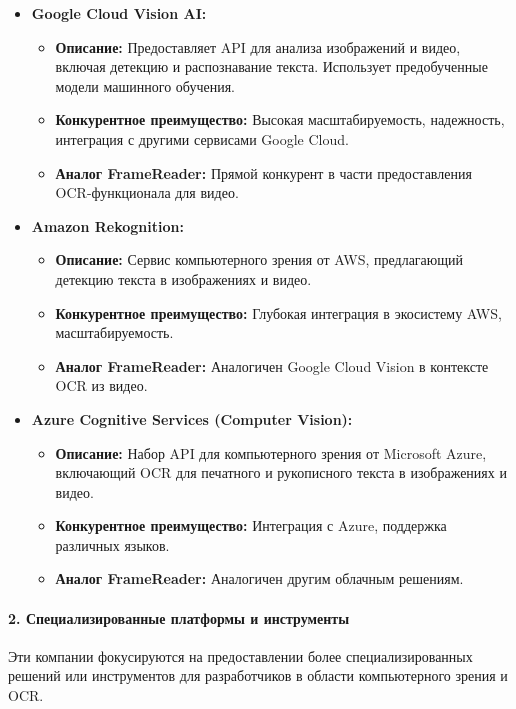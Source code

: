 \documentclass[12pt, a4paper]{article}
\theoremstyle{definition}
\theoremstyle{remark}
\begin{document}
	\begin{itemize}
		\item \textbf{Google Cloud Vision AI:}
		\begin{itemize}
			\item \textbf{Описание:} Предоставляет API для анализа изображений и видео, включая детекцию и распознавание текста. Использует предобученные модели машинного обучения.
			\item \textbf{Конкурентное преимущество:} Высокая масштабируемость, надежность, интеграция с другими сервисами Google Cloud.
			\item \textbf{Аналог FrameReader:} Прямой конкурент в части предоставления OCR-функционала для видео.
		\end{itemize}
		\item \textbf{Amazon Rekognition:}
		\begin{itemize}
			\item \textbf{Описание:} Сервис компьютерного зрения от AWS, предлагающий детекцию текста в изображениях и видео.
			\item \textbf{Конкурентное преимущество:} Глубокая интеграция в экосистему AWS, масштабируемость.
			\item \textbf{Аналог FrameReader:} Аналогичен Google Cloud Vision в контексте OCR из видео.
		\end{itemize}
		\item \textbf{Azure Cognitive Services (Computer Vision):}
		\begin{itemize}
			\item \textbf{Описание:} Набор API для компьютерного зрения от Microsoft Azure, включающий OCR для печатного и рукописного текста в изображениях и видео.
			\item \textbf{Конкурентное преимущество:} Интеграция с Azure, поддержка различных языков.
			\item \textbf{Аналог FrameReader:} Аналогичен другим облачным решениям.
		\end{itemize}
	\end{itemize}
	
	\paragraph{2. Специализированные платформы и инструменты}
	Эти компании фокусируются на предоставлении более специализированных решений или инструментов для разработчиков в области компьютерного зрения и OCR.
	
\end{document}
